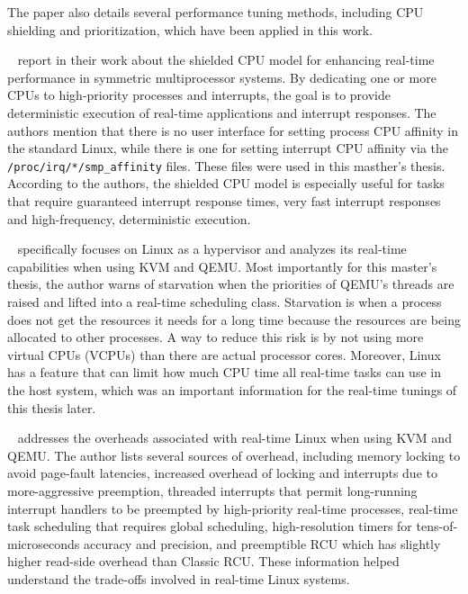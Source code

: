 \documentclass[MMR,Master,english]{twbook}
\begin{document}
\noindent The paper also details several performance tuning methods, including CPU shielding and prioritization, which have been applied in this work.

\bigskip \noindent \citeauthor{broskyShieldedProcessorsGuaranteeing2003}~\cite{broskyShieldedProcessorsGuaranteeing2003} report in their work about the shielded CPU model for enhancing real-time performance in symmetric multiprocessor systems. By dedicating one or more CPUs to high-priority processes and interrupts, the goal is to provide deterministic execution of real-time applications and interrupt responses. The authors mention that there is no user interface for setting process CPU affinity in the standard Linux, while there is one for setting interrupt CPU affinity via the \texttt{/proc/irq/*/smp\_affinity} files. These files were used in this masther's thesis. According to the authors, the shielded CPU model is especially useful for tasks that require guaranteed interrupt response times, very fast interrupt responses and high-frequency, deterministic execution.

\bigskip \noindent \citeauthor{kiszkaLinuxRealTimeHypervisor}~\cite{kiszkaLinuxRealTimeHypervisor} specifically focuses on Linux as a hypervisor and analyzes its real-time capabilities when using KVM and QEMU. Most importantly for this master's thesis, the author warns of starvation when the priorities of QEMU’s threads are raised and lifted into a real-time scheduling class. Starvation is when a process does not get the resources it needs for a long time because the resources are being allocated to other processes. A way to reduce this risk is by not using more virtual CPUs (VCPUs) than there are actual processor cores. Moreover, Linux has a feature that can limit how much CPU time all real-time tasks can use in the host system, which was an important information for the real-time tunings of this thesis later.

\bigskip \noindent \citeauthor{mckenneyRealTimeVs}~\cite{mckenneyRealTimeVs} addresses the overheads associated with real-time Linux when using KVM and QEMU. The author lists several sources of overhead, including memory locking to avoid page-fault latencies, increased overhead of locking and interrupts due to more-aggressive preemption, threaded interrupts that permit long-running interrupt handlers to be preempted by high-priority real-time processes, real-time task scheduling that requires global scheduling, high-resolution timers for tens-of-microseconds accuracy and precision, and preemptible RCU which has slightly higher read-side overhead than Classic RCU. These information helped understand the trade-offs involved in real-time Linux systems.
\end{document}
